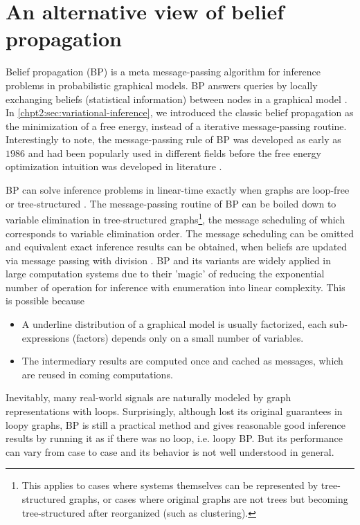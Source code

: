 \chapter{An alternative view of belief propagation}
\label{chapter3}
\graphicspath{{source/chapter3/}}

Belief propagation (BP) is a meta message-passing algorithm for inference problems in probabilistic graphical models. BP answers queries by locally exchanging beliefs (statistical information) between nodes in a graphical model \cite{kschischang2001factor_graph, Bishop:2006:PRM:1162264}. In \autoref{chpt2:sec:variational-inference}, we introduced the classic belief propagation as the minimization of a free energy, instead of a iterative message-passing routine. Interestingly to note, the message-passing rule of BP was developed as early as $1986$ \cite{pearl1986b} and had been popularly used in different fields before the free energy optimization intuition was developed in literature \cite{yedidia2003understanding}.

BP can solve inference problems in linear-time exactly when graphs are loop-free or tree-structured \cite{kschischang2001factor_graph}. The message-passing routine of BP can be boiled down to variable elimination in tree-structured graphs\footnote{This applies to cases where systems themselves can be represented by tree-structured graphs, or cases where original graphs are not trees but becoming tree-structured after reorganized (such as clustering).}, the message scheduling of which corresponds to variable elimination order. The message scheduling can be omitted and equivalent exact inference results can be obtained, when beliefs are updated via message passing with division \cite[section~10.3]{koller2009pgm}. BP and its variants are widely applied in large computation systems due to their 'magic' of reducing the exponential number of operation for inference with enumeration into linear complexity. This is possible because 
\begin{itemize}
\item A underline distribution of a graphical model is usually factorized, each sub-expressions (factors) depends only on a small number of variables.
\item The intermediary results are computed once and cached as messages, which are reused in coming computations. 
\end{itemize}

Inevitably, many real-world signals are naturally modeled by graph representations with loops. Surprisingly, although lost its original guarantees in loopy graphs, BP is still a practical method and gives reasonable good inference results by running it as if there was no loop, i.e. loopy BP. But its performance can vary from case to case and its behavior is not well understood in general. 

